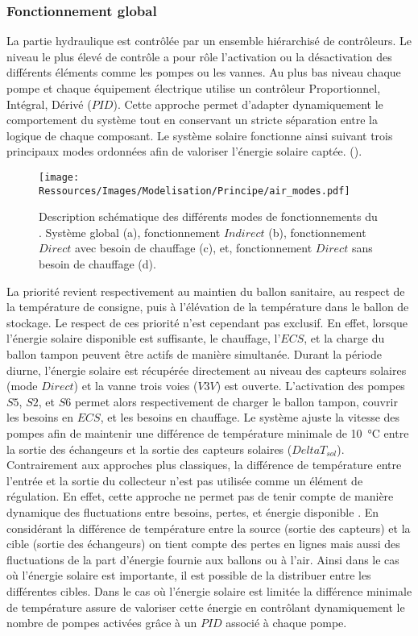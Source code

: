 \subsubsection{Fonctionnement global} %
\label{ssub:fonctionnement_global}
La partie hydraulique est contrôlée par un ensemble hiérarchisé de contrôleurs. Le niveau
le plus élevé de contrôle a pour rôle l’activation ou la désactivation des différents
éléments comme les pompes ou les vannes. Au plus bas niveau chaque pompe et chaque
équipement électrique utilise un contrôleur Proportionnel, Intégral, Dérivé ($PID$). Cette
approche permet d’adapter dynamiquement le comportement du système tout en conservant un
stricte séparation entre la logique de chaque composant. Le système solaire fonctionne
ainsi suivant trois principaux modes ordonnées afin de valoriser l’énergie solaire captée.
().
\begin{figure}
    \centering
    \texttt{[image: Ressources/Images/Modelisation/Principe/air\_modes.pdf]}
    \caption[Description schématique des différents modes de fonctionnements du ]
    {Description schématique des différents modes de fonctionnements du . Système
    global (a), fonctionnement $Indirect$ (b), fonctionnement $Direct$ avec besoin de
    chauffage (c), et, fonctionnement $Direct$ sans besoin de chauffage (d).}
    \label{fig:schema_modes}
\end{figure}

La priorité revient respectivement au maintien du ballon sanitaire, au respect de la température de
consigne, puis à l’élévation de la température dans le ballon de stockage. Le respect de
ces priorité n’est cependant pas exclusif. En effet, lorsque l’énergie solaire disponible est
suffisante, le chauffage, l’$ECS$, et la charge du ballon tampon peuvent être actifs de
manière simultanée.
Durant la période diurne, l’énergie solaire est récupérée directement au niveau des
capteurs solaires (mode $Direct$) et la vanne trois voies ($V3V$) est ouverte.
L’activation des pompes $S5$, $S2$, et $S6$ permet alors respectivement de charger le
ballon tampon, couvrir les besoins en $ECS$, et les besoins en chauffage. Le système
ajuste la vitesse des pompes afin de maintenir une différence de température minimale de
\SI{10}{\celsius} entre la sortie des échangeurs et la sortie des capteurs solaires
($DeltaT_{sol}$). Contrairement aux approches plus classiques, la différence de
température entre l’entrée et la sortie du collecteur n’est pas utilisée comme un élément
de régulation. En effet, cette approche ne permet pas de tenir compte de manière dynamique
des fluctuations entre besoins, pertes, et énergie disponible \parencite{Mosallat2013686}.
En considérant la différence de température entre la source (sortie des capteurs) et la
cible (sortie des échangeurs) on tient compte des pertes en lignes mais aussi des
fluctuations de la part d’énergie fournie aux ballons ou à l’air. Ainsi dans le cas où
l’énergie solaire est importante, il est possible de la distribuer entre les différentes
cibles. Dans le cas où l’énergie solaire est limitée la différence minimale de température
assure de valoriser cette énergie en contrôlant dynamiquement le nombre de pompes activées
grâce à un $PID$ associé à chaque pompe.


